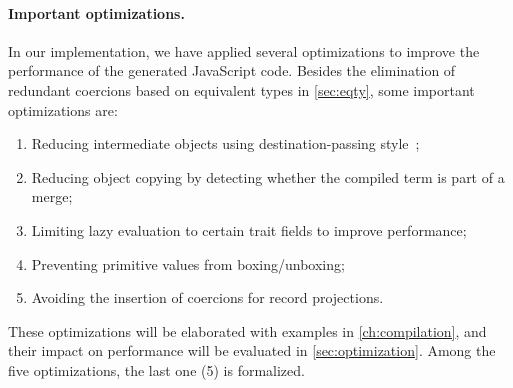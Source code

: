 \paragraph{Important optimizations.}
In our implementation, we have applied several optimizations to improve the
performance of the generated JavaScript code. Besides the elimination of
redundant coercions based on equivalent types in \autoref{sec:eqty}, some
important optimizations are:
\begin{enumerate}
\item Reducing intermediate objects using destination-passing
      style~\citep{shaikhha2017destination};
\item Reducing object copying by detecting whether the compiled term is part of
      a merge;
\item Limiting lazy evaluation to certain trait fields to improve performance;
\item Preventing primitive values from boxing/unboxing;
\item Avoiding the insertion of coercions for record projections.
\end{enumerate}
These optimizations will be elaborated with examples in
\autoref{ch:compilation}, and their impact on performance will be evaluated in
\autoref{sec:optimization}. Among the five optimizations, the last one (5\th) is
formalized.
